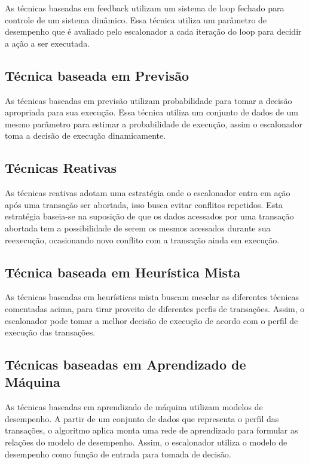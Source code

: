\documentclass[ti]{texufpel} %
\begin{document}
As técnicas baseadas em feedback utilizam um sistema de loop fechado para controle de um sistema dinâmico. Essa técnica utiliza um parâmetro de desempenho que é avaliado pelo escalonador a cada iteração do loop para decidir a ação a ser executada.

\subsection{Técnica baseada em Previsão}

As técnicas baseadas em previsão utilizam probabilidade para tomar a decisão apropriada para sua execução. Essa técnica utiliza um conjunto de dados de um mesmo parâmetro para estimar a probabilidade de execução, assim o escalonador toma a decisão de execução dinamicamente.

\subsection{Técnicas Reativas}

As técnicas reativas adotam uma estratégia onde o escalonador entra em ação após uma transação ser abortada, isso busca evitar conflitos repetidos. Esta estratégia baseia-se na suposição de que os dados acessados por uma transação abortada tem a possibilidade de serem os mesmos acessados durante sua reexecução, ocasionando novo conflito com a transação ainda em execução.

\subsection{Técnica baseada em Heurística Mista}

As técnicas baseadas em heurísticas mista buscam mesclar as diferentes técnicas comentadas acima, para tirar proveito de diferentes perfis de transações. Assim, o escalonador pode tomar a melhor decisão de execução de acordo com o perfil de execução das transações.

\subsection{Técnicas baseadas em Aprendizado de Máquina}

As técnicas baseadas em aprendizado de máquina utilizam modelos de desempenho. A partir de um conjunto de dados que representa o perfil das transações, o algoritmo aplica monta uma rede de aprendizado para formular as relações do modelo de desempenho. Assim, o escalonador utiliza o modelo de desempenho como função de entrada para tomada de decisão.
\end{document}
